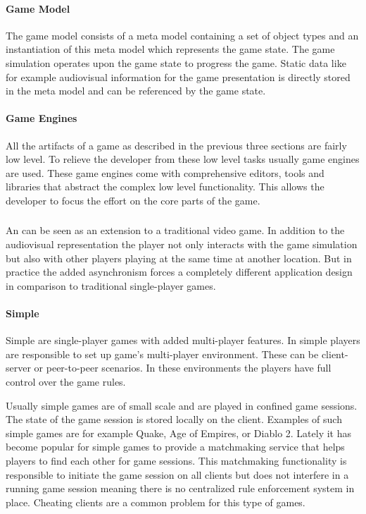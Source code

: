 \paragraph{Game Model}

The game model consists of a meta model containing a set of object types and an
instantiation of this meta model which represents the game state. The game
simulation operates upon the game state to progress the game. Static data
like for example audiovisual information for the game presentation is directly
stored in the meta model and can be referenced by the game state.

\paragraph{Game Engines}
All the artifacts of a game as described in the previous three sections are
fairly low level. To relieve the developer from these low level tasks usually
game engines are used. These game engines come with comprehensive editors, tools
and libraries that abstract the complex low level functionality. This allows the
developer to focus the effort on the core parts of the game. 

\subsubsection{\ogs{}}
An \og{} can be seen as an extension to a traditional video game. In addition to
the audiovisual representation the player not only interacts with the game
simulation but also with other players playing at the same time at another
location. But in practice the added asynchronism forces a completely different
application design in comparison to traditional single-player games.

\paragraph{Simple \ogs{}}

Simple \ogs{} are single-player games with added multi-player features.
In simple \ogs{} players are responsible to set up game's multi-player
environment. These can be client-server or peer-to-peer scenarios. In these
environments the players have full control over the game rules.

Usually simple games are of small scale and are played in confined game
sessions. The state of the game session is stored locally on the client.
Examples of such simple games are for example Quake, Age of Empires, or Diablo
2. Lately it has become popular for simple games to provide a matchmaking
service that helps players to find each other for game sessions. This
matchmaking functionality is responsible to initiate the game session on all
clients but does not interfere in a running game session meaning there is no
centralized rule enforcement system in place. Cheating clients are a common
problem for this type of games.


